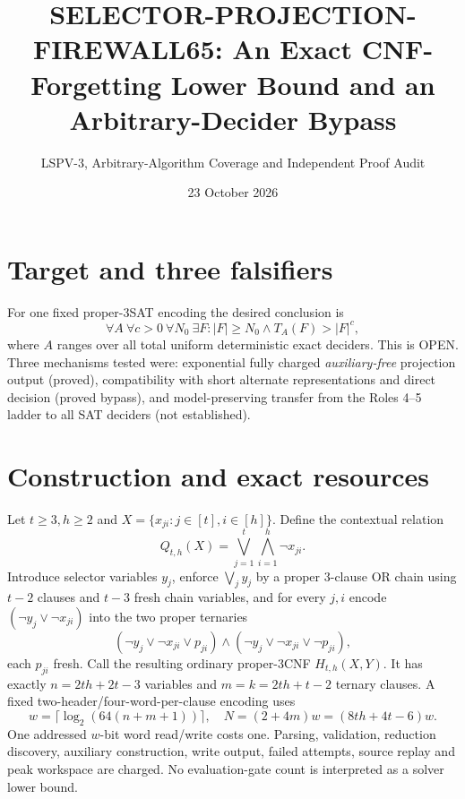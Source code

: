 \documentclass[11pt]{article}
\title{SELECTOR-PROJECTION-FIREWALL65: An Exact CNF-Forgetting Lower Bound and an Arbitrary-Decider Bypass}
\author{LSPV-3, Arbitrary-Algorithm Coverage and Independent Proof Audit}
\date{23 October 2026}
\begin{document}
\maketitle
\begin{center}
\end{center}
\section{Target and three falsifiers}
For one fixed proper-3SAT encoding the desired conclusion is
\[
\forall A\ \forall c>0\ \forall N_0\ \exists F:
|F|\ge N_0\land T_A(F)>|F|^c,
\]
where $A$ ranges over all total uniform deterministic exact deciders. This is OPEN. Three mechanisms tested were: exponential fully charged \emph{auxiliary-free} projection output (proved), compatibility with short alternate representations and direct decision (proved bypass), and model-preserving transfer from the Roles 4--5 ladder to all SAT deciders (not established).

\section{Construction and exact resources}
Let $t\ge3,h\ge2$ and $X=\{x_{ji}:j\in[t],i\in[h]\}$. Define the contextual relation
\[
Q_{t,h}(X)=\bigvee_{j=1}^t\bigwedge_{i=1}^h\neg x_{ji}.
\]
Introduce selector variables $y_j$, enforce $\bigvee_j y_j$ by a proper 3-clause OR chain using $t-2$ clauses and $t-3$ fresh chain variables, and for every $j,i$ encode $(\neg y_j\vee\neg x_{ji})$ into the two proper ternaries
\[
(\neg y_j\vee\neg x_{ji}\vee p_{ji})\wedge
(\neg y_j\vee\neg x_{ji}\vee\neg p_{ji}),
\]
each $p_{ji}$ fresh. Call the resulting ordinary proper-3CNF $H_{t,h}(X,Y)$.
It has exactly $n=2th+2t-3$ variables and $m=k=2th+t-2$ ternary clauses. A fixed two-header/four-word-per-clause encoding uses
\[
w=\lceil\log_2(64(n+m+1))\rceil,\quad N=(2+4m)w=(8th+4t-6)w.
\]
One addressed $w$-bit word read/write costs one. Parsing, validation, reduction discovery, auxiliary construction, write output, failed attempts, source replay and peak workspace are charged. No evaluation-gate count is interpreted as a solver lower bound.
\end{document}

